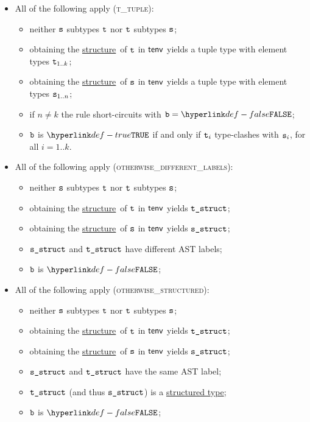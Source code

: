 \documentclass{book}
\newcommand\structuredtype[0]{\hyperlink{def-structuredtype}{structured type}}
\newcommand\structure[0]{\hyperlink{def-structure}{structure}}
\begin{document}
\begin{itemize}
  \item All of the following apply (\textsc{t\_tuple}):
  \begin{itemize}
    \item neither $\texttt{s}$ subtypes $\texttt{t}$ nor $\texttt{t}$ subtypes $\texttt{s}$;
    \item obtaining the \structure\ of $\texttt{t}$ in $\textsf{tenv}$ yields a tuple type with element types $\texttt{t}_{1..k}$;
    \item obtaining the \structure\ of $\texttt{s}$ in $\textsf{tenv}$ yields a tuple type with element types $\texttt{s}_{1..n}$;
    \item if $n \neq k$ the rule short-circuits with $\vb=\False$;
    \item $\texttt{b}$ is $\True$ if and only if $\texttt{t}_i$ type-clashes with $\texttt{s}_i$, for all $i=1..k$.
  \end{itemize}

  \item All of the following apply (\textsc{otherwise\_different\_labels}):
  \begin{itemize}
    \item neither $\texttt{s}$ subtypes $\texttt{t}$ nor $\texttt{t}$ subtypes $\texttt{s}$;
    \item obtaining the \structure\ of $\texttt{t}$ in $\textsf{tenv}$ yields $\texttt{t\_struct}$;
    \item obtaining the \structure\ of $\texttt{s}$ in $\textsf{tenv}$ yields $\texttt{s\_struct}$;
    \item $\texttt{s\_struct}$ and $\texttt{t\_struct}$ have different AST labels;
    \item $\texttt{b}$ is $\False$;
  \end{itemize}

  \item All of the following apply (\textsc{otherwise\_structured}):
  \begin{itemize}
    \item neither $\texttt{s}$ subtypes $\texttt{t}$ nor $\texttt{t}$ subtypes $\texttt{s}$;
    \item obtaining the \structure\ of $\texttt{t}$ in $\textsf{tenv}$ yields $\texttt{t\_struct}$;
    \item obtaining the \structure\ of $\texttt{s}$ in $\textsf{tenv}$ yields $\texttt{s\_struct}$;
    \item $\texttt{s\_struct}$ and $\texttt{t\_struct}$ have the same AST label;
    \item $\texttt{t\_struct}$ (and thus $\texttt{s\_struct}$) is a \structuredtype;
    \item $\texttt{b}$ is $\False$;
  \end{itemize}
\end{itemize}
\end{document}
